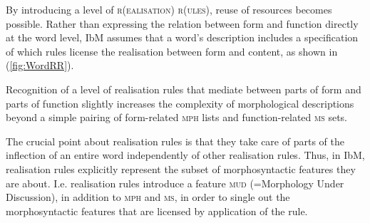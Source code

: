 \documentclass[output=paper
                ,modfonts
                ,nonflat
	        ,collection
	        ,collectionchapter
	        ,collectiontoclongg
 	        ,biblatex
                ,babelshorthands
                ,newtxmath
                ,draftmode
                ,colorlinks, citecolor=brown
] {langscibook}
\begin{document}
{By  introducing a level of \textsc{r(ealisation) r(ules)}, reuse
of resources becomes possible. Rather than expressing the relation
between form and function directly at the word level, IbM assumes that
a word's description includes a specification of which rules license
the realisation between form and content, as shown in 
(\ref{fig:WordRR}).


\begin{exe}

     

\label{fig:WordRR}
\end{exe}

Recognition of a level of realisation rules that mediate between parts
of form and parts of function slightly increases the complexity of
morphological descriptions beyond a simple pairing of form-related
\textsc{mph} lists and function-related \textsc{ms} sets. 

The crucial point about realisation rules is that they take care of
parts of the inflection of an entire word independently of other
realisation rules. Thus, in IbM, realisation rules explicitly
represent the subset of morphosyntactic  features they are
about. I.e. realisation rules introduce a feature \textsc{mud}
(=Morphology Under Discussion), in addition to \textsc{mph} and
\textsc{ms}, in order to single out the morphosyntactic features that
are licensed by application of the rule.

}
\end{document}
